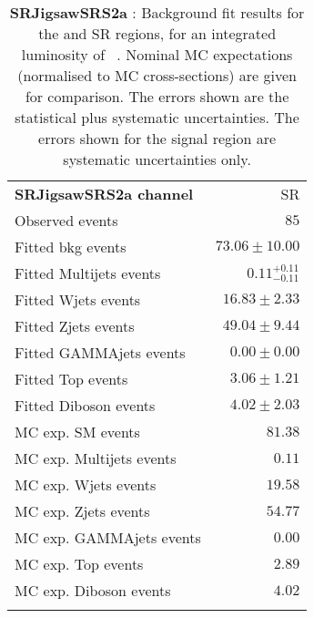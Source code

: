

\begin{table}
\begin{center}
\setlength{\tabcolsep}{0.0pc}
{\tiny
\begin{tabular*}{\textwidth}{@{\extracolsep{\fill}}lr}
\noalign{\smallskip}\hline\noalign{\smallskip}
{\bf SRJigsawSRS2a channel}           & SR              \\[-0.05cm]
\noalign{\smallskip}\hline\noalign{\smallskip}
Observed events          & $85$                    \\
\noalign{\smallskip}\hline\noalign{\smallskip}
Fitted bkg events         & $73.06 \pm 10.00$              \\
\noalign{\smallskip}\hline\noalign{\smallskip}
        Fitted Multijets events         & $0.11_{-0.11}^{+0.11}$              \\
        Fitted Wjets events         & $16.83 \pm 2.33$              \\
        Fitted Zjets events         & $49.04 \pm 9.44$              \\
        Fitted GAMMAjets events         & $0.00 \pm 0.00$              \\
        Fitted Top events         & $3.06 \pm 1.21$              \\
        Fitted Diboson events         & $4.02 \pm 2.03$              \\
 \noalign{\smallskip}\hline\noalign{\smallskip}
MC exp. SM events              & $81.38$              \\
\noalign{\smallskip}\hline\noalign{\smallskip}
        MC exp. Multijets events         & $0.11$              \\
        MC exp. Wjets events         & $19.58$              \\
        MC exp. Zjets events         & $54.77$              \\
        MC exp. GAMMAjets events         & $0.00$              \\
        MC exp. Top events         & $2.89$              \\
        MC exp. Diboson events         & $4.02$              \\
\noalign{\smallskip}\hline\noalign{\smallskip}
\end{tabular*}
}
\end{center}
\caption{{\bf SRJigsawSRS2a} : Background fit results for the  and SR regions, for an integrated luminosity of \ourintlumi~\ifb. Nominal MC expectations (normalised to MC cross-sections) are given for comparison. The errors shown are the statistical plus systematic uncertainties. The errors shown for the signal region are systematic uncertainties only.}
\label{table.results.systematics.in.logL.fit.SR.SRJigsawSRS2a}
\end{table}
%